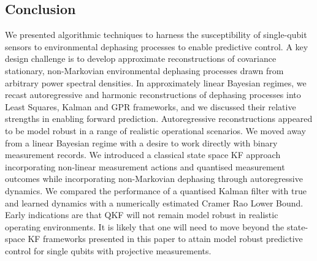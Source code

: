 \subsection{Conclusion}
We presented algorithmic techniques to harness the susceptibility of single-qubit sensors to environmental dephasing processes to enable predictive control. A key design challenge is to develop approximate reconstructions of covariance stationary, non-Markovian environmental dephasing processes drawn from arbitrary power spectral densities. In approximately linear Bayesian regimes, we recast autoregressive and harmonic reconstructions of dephasing processes into Least Squares, Kalman and GPR frameworks, and we discussed their relative strengths in enabling forward prediction. Autoregressive reconstructions appeared to be model robust in a range of realistic operational scenarios. We moved away from a linear Bayesian regime with a desire to work directly with binary measurement records. We introduced a classical state space KF approach incorporating non-linear measurement actions and quantised measurement outcomes while incorporating non-Markovian dephasing through autoregressive dynamics. We compared the performance of a quantised Kalman filter with true and learned dynamics with a numerically estimated Cramer Rao Lower Bound.  Early indications are that QKF will not remain model robust in realistic operating environments. It is likely that one will need to move beyond the state-space KF frameworks presented in this paper to attain model robust predictive control for single qubits with projective measurements. 



